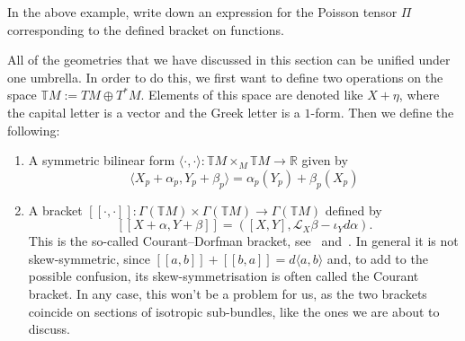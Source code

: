 \begin{exercise}
In the above example, write down an expression for the Poisson tensor $\Pi$ corresponding to the defined bracket on functions.
\end{exercise}
All of the geometries that we have discussed in this section can be unified under one umbrella. In order to do this, we first want to define two operations on the space $\mathbb{T}M:=TM\oplus T^*M$. Elements of this space are denoted like $X+\eta$, where the capital letter is a vector and the Greek letter is a $1$-form. Then we define the following:
\begin{enumerate}
  \item A symmetric bilinear form $\langle\cdot,\cdot\rangle:\mathbb{T}M\times_M\mathbb{T}M\to\mathbb{R}$ given by $$\langle X_p + \alpha_p,Y_p + \beta_p\rangle=\alpha_p(Y_p)+\beta_p(X_p)$$
  \item A bracket  $[\![\cdot,\cdot]\!]:\Gamma(\mathbb{T}M)\times\Gamma(\mathbb{T}M)\to\Gamma(\mathbb{T}M)$ defined by $$[\![X+\alpha,Y+\beta]\!]=([X,Y],\mathcal{L}_X\beta-\iota_Yd\alpha).$$
  This is the so-called Courant--Dorfman bracket, see~\cite[Theorem~2.1(a)]{book:dorfman} and~\cite[eq.~(2.3) with $H=0$]{Gualtieri_2011}. In general it is not skew-symmetric, since $[\![a,b]\!]+[\![b,a]\!] = d\langle a,b\rangle$ and, to add to the possible confusion, its skew-symmetrisation is often called the Courant bracket. In any case, this won't be a problem for us, as the two brackets coincide on sections of isotropic sub-bundles, like the ones we are about to discuss.
\end{enumerate}

